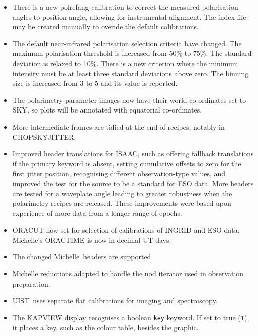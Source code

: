 \documentclass[twoside,11pt]{article}
\newcommand{\htmladdnormallink}[2]{#1}
\renewcommand{\_}{\texttt{\symbol{95}}}
\newcommand{\ISAAC}{\htmladdnormallink{ISAAC}{http://www.eso.org/instruments/isaac/}}
\newcommand{\Michelle}{\htmladdnormallink{Michelle}{http://www.jach.hawaii.edu/JACpublic/UKIRT/instruments/michelle/michelle.html}}
\newcommand{\UIST}{\htmladdnormallink{UIST}{http://www.jach.hawaii.edu/JACpublic/UKIRT/instruments/uist/uist.html}}
\begin{document}
\begin{itemize}
   \item There is a new polrefang calibration to correct the measured
   polarisation angles to position angle, allowing for instrumental
   alignment. The index file may be created manually to overide the
   default calibrations.

   \item The default near-infrared polarisation selection criteria
   have changed.  The maximum polarisation threshold is increased from
   50\% to 75\%.  The standard deviation is relaxed to 10\%.  There is
   a new criterion where the minimum intensity must be at least three
   standard deviations above zero.  The binning size is increased from
   3 to 5 and its value is reported.

   \item The polarimetry-parameter images now have their world
   co-ordinates set to SKY, so plots will be annotated with equatorial
   co-ordinates.

   \item More intermediate frames are tidied at the end of recipes,
   notably in CHOP\_SKY\_JITTER.

   \item Improved header translations for \ISAAC, such as offering
   fallback translations if the primary keyword is absent, setting
   cumulative offsets to zero for the first jitter position,
   recognising different observation-type values, and improved the
   test for the source to be a standard for ESO data.  More headers
   are tested for a waveplate angle leading to greater robustness when
   the polarimetry recipes are released. These improvements were based
   upon experience of more data from a longer range of epochs.

   \item ORACUT now set for selection of calibrations of INGRID and ESO
   data.  Michelle's ORACTIME is now in decimal UT days.

   \item The changed \Michelle\ headers are supported.

   \item Michelle reductions adapted to handle the nod iterator used
   in observation preparation.

   \item \UIST\ uses separate flat calibrations for imaging and
   spectroscopy.

   \item The KAPVIEW display recognises a boolean {\tt key} keyword.
   If set to true ({\tt{1}}), it places a key, such as the colour
   table, besides the graphic.

\end{itemize}
\end{document}
